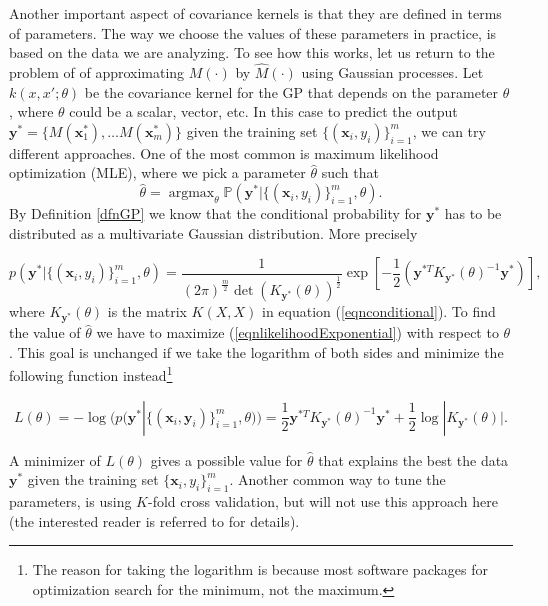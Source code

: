 \documentclass[12pt]{book}
\newcommand{\p}{\mathbb{P}}
\newcommand{\x}{\textbf{x}}
\newcommand{\y}{\textbf{y}}
\newcommand{\argmax}{\mathop{\mathrm{argmax}}}
\begin{document}
Another important aspect of covariance kernels is that they are  defined in terms of parameters. 
The way we choose the values of these parameters in practice, is based on the data
we are analyzing. To see how this works, let us return to the problem of of approximating $M(\cdot)$
by $\widehat{M}(\cdot)$ using Gaussian processes. Let   $k(x,x';\theta)$ be the covariance
kernel for the GP that depends on the parameter $\theta$, where
$\theta$ could be a scalar, vector, etc. In this case to predict the output
$\y^{*}=\{M(\x_{1}^{*}),\ldots M(\x_{m}^{*})\}$ given the training set $\{(\x_{i},y_{i})\}_{i=1}^{m}$, 
we can try different approaches. One of the most common is maximum likelihood optimization (MLE), where 
we pick a parameter $\hat{\theta}$ such that
\begin{equation*}
\hat{\theta}=\argmax_{\theta}\p(\y^{*}|\{(\x_{i},y_{i})\}_{i=1}^{m},\theta).
\end{equation*}
By Definition \ref{dfnGP} we know that the conditional probability for $\y^{*}$ has to be distributed as
a multivariate Gaussian distribution. More precisely

\begin{equation}\label{eqnlikelihoodExponential}
p(\y^{*}|\{(\x_{i},y_{i})\}_{i=1}^{m},\theta)=\frac{1}{(2\pi)^{\frac{m}{2}}\det(K_{\y^{*}}(\theta))^{\frac{1}{2}}}
\exp\left[-\frac{1}{2}(\y^{*T}K_{\y^{*}}(\theta)^{-1}\y^{*})\right],
\end{equation}
where $K_{\y^{*}}(\theta)$ is the matrix $K(X,X)$ in equation (\ref{eqnconditional}). 
To find the value of $\hat{\theta}$ we have to maximize (\ref{eqnlikelihoodExponential})
with respect to $\theta$.
This goal is unchanged if we take the logarithm of  both sides and minimize the following
function instead\footnote{The reason for taking the logarithm is because most
software packages for optimization search for the minimum, not the maximum.}


\begin{equation}\label{eqnloglikelihood}
L(\theta)=-\log(p(\y^{*}|\{(\x_{i},\y_{i})\}_{i=1}^{m},\theta))=\frac{1}{2}\y^{*T}K_{\y^{*}}(\theta)^{-1}\y^{*}+
\frac{1}{2}\log|K_{\y^{*}}(\theta)|.
\end{equation}

A minimizer of $L(\theta)$   gives  a possible value for $\hat{\theta}$
that explains the best the data $\y^{*}$ given the training set $\{\x_{i},y_{i}\}_{i=1}^{m}$.  
Another common way to tune the parameters,
is using  $K$-fold cross validation, but will not use this approach here (the interested
reader is referred to \cite{murphy2012machine} for details).
\newline
\end{document}
